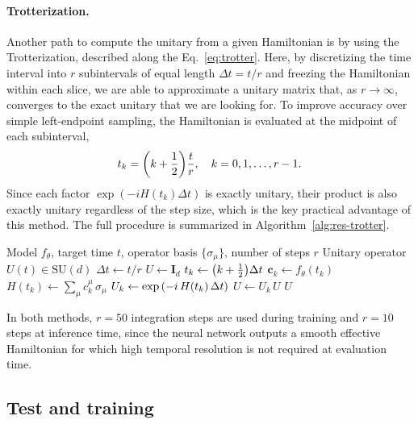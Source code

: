 \paragraph{Trotterization.}
Another path to compute the unitary from a given Hamiltonian is by using the Trotterization, described along the Eq.~\eqref{eq:trotter}. Here, by discretizing the time interval into $r$ subintervals of equal length $\Delta t = t/r$ and freezing the Hamiltonian within each slice, we are able to approximate a unitary matrix that, as $r \to \infty$, converges to the exact unitary that we are looking for. To improve accuracy over simple left-endpoint sampling, the Hamiltonian is evaluated at the midpoint of each subinterval,
\begin{equation}
    t_k = \qty(k + \frac{1}{2})\frac{t}{r},
    \quad k = 0, 1, \ldots, r-1.
\end{equation}
Since each factor $\exp(-i H(t_k)\Delta t)$ is exactly unitary, their product is also exactly unitary regardless of the step size, which is the key practical advantage of this method. The full procedure is summarized in Algorithm~\ref{alg:res-trotter}.

\begin{algorithm}[htbp]
\caption{Trotterization}
\label{alg:res-trotter}
\begin{algorithmic}[1]
\REQUIRE Model $f_\theta$, target time $t$, operator basis $\{\sigma_\mu\}$,
         number of steps $r$
\ENSURE Unitary operator $U(t) \in \mathrm{SU}(d)$
\STATE $\Delta t \leftarrow t / r$
\STATE $U \leftarrow \mathbf{I}_d$
    \STATE $t_k \leftarrow \qty(k + \frac{1}{2})\Delta t$
    \STATE $\bm{c}_k \leftarrow f_\theta(t_k)$
    \STATE $H(t_k) \leftarrow \sum_\mu c_k^\mu\,\sigma_\mu$
    \STATE $U_k \leftarrow \exp\qty(-i\,H(t_k)\,\Delta t)$
    \STATE $U \leftarrow U_k\,U$
\ENDFOR
\RETURN $U$
\end{algorithmic}
\end{algorithm}

In both methods, $r = 50$ integration steps are used during training and $r = 10$ steps at inference time, since the neural network outputs a smooth effective Hamiltonian for which high temporal resolution is not required at evaluation time.

\subsection{Test and training}
\label{sec:res-test-train}

